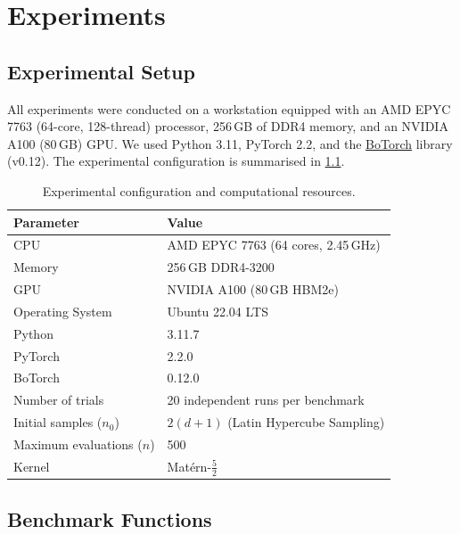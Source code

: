 \chapter{Experiments}
\label{ch:experiments}

\section{Experimental Setup}
\label{sec:experimental-setup}

All experiments were conducted on a workstation equipped with an AMD EPYC 7763
(64-core, 128-thread) processor, 256\,GB of DDR4 memory, and an NVIDIA A100
(80\,GB) GPU.  We used Python 3.11, PyTorch 2.2, and the
\href{https://github.com/pytorch/botorch}{BoTorch} library (v0.12).  The
experimental configuration is summarised in \cref{tab:setup}.

\begin{table}[htbp]
    \centering
    \caption{Experimental configuration and computational resources.}
    \label{tab:setup}
    \begin{tabularx}{\textwidth}{@{}lX@{}}
        \toprule
        \textbf{Parameter} & \textbf{Value} \\
        \midrule
        CPU & AMD EPYC 7763 (64 cores, 2.45\,GHz) \\
        Memory & 256\,GB DDR4-3200 \\
        GPU & NVIDIA A100 (80\,GB HBM2e) \\
        Operating System & Ubuntu 22.04 LTS \\
        Python & 3.11.7 \\
        PyTorch & 2.2.0 \\
        BoTorch & 0.12.0 \\
        Number of trials & 20 independent runs per benchmark \\
        Initial samples ($n_0$) & $2(d+1)$ (Latin Hypercube Sampling) \\
        Maximum evaluations ($n$) & 500 \\
        Kernel & Mat\'ern-$\frac{5}{2}$ \\
        \bottomrule
    \end{tabularx}
\end{table}

\section{Benchmark Functions}
\label{sec:benchmarks}

